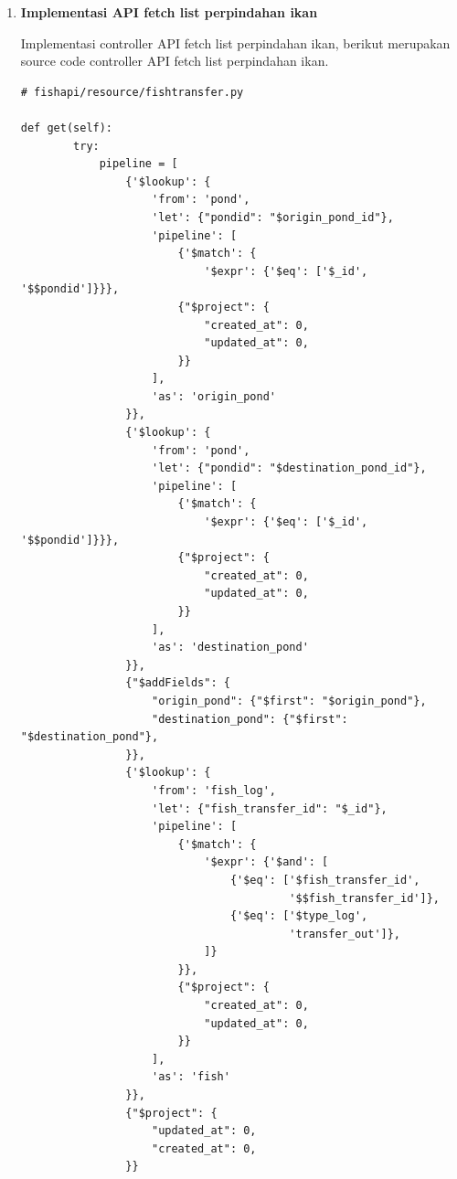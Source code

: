 \begin{enumerate}[1.]
response json:

\begin{lstlisting}
{
  "message": "success add fishtransfer"
}
\end{lstlisting}




\item \textbf{Implementasi API fetch list perpindahan ikan}

Implementasi controller API fetch list perpindahan ikan, berikut merupakan source code controller API fetch list perpindahan ikan.

\begin{lstlisting}
# fishapi/resource/fishtransfer.py

def get(self):
        try:
            pipeline = [
                {'$lookup': {
                    'from': 'pond',
                    'let': {"pondid": "$origin_pond_id"},
                    'pipeline': [
                        {'$match': {
                            '$expr': {'$eq': ['$_id', '$$pondid']}}},
                        {"$project": {
                            "created_at": 0,
                            "updated_at": 0,
                        }}
                    ],
                    'as': 'origin_pond'
                }},
                {'$lookup': {
                    'from': 'pond',
                    'let': {"pondid": "$destination_pond_id"},
                    'pipeline': [
                        {'$match': {
                            '$expr': {'$eq': ['$_id', '$$pondid']}}},
                        {"$project": {
                            "created_at": 0,
                            "updated_at": 0,
                        }}
                    ],
                    'as': 'destination_pond'
                }},
                {"$addFields": {
                    "origin_pond": {"$first": "$origin_pond"},
                    "destination_pond": {"$first": "$destination_pond"},
                }},
                {'$lookup': {
                    'from': 'fish_log',
                    'let': {"fish_transfer_id": "$_id"},
                    'pipeline': [
                        {'$match': {
                            '$expr': {'$and': [
                                {'$eq': ['$fish_transfer_id',
                                         '$$fish_transfer_id']},
                                {'$eq': ['$type_log',
                                         'transfer_out']},
                            ]}
                        }},
                        {"$project": {
                            "created_at": 0,
                            "updated_at": 0,
                        }}
                    ],
                    'as': 'fish'
                }},
                {"$project": {
                    "updated_at": 0,
                    "created_at": 0,
                }}


\end{lstlisting}
\end{enumerate}
